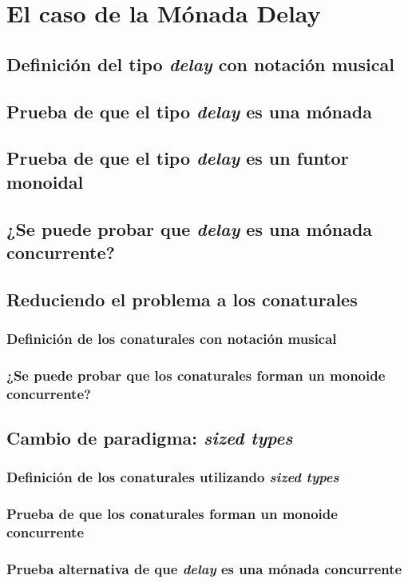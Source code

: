 \chapter{El caso de la Mónada Delay}\label{chapter:casodelay}

\section{Definición del tipo \textit{delay} con notación musical}\label{casodelay:defmus}

\section{Prueba de que el tipo \textit{delay} es una mónada}

\section{Prueba de que el tipo \textit{delay} es un funtor monoidal}

\section{¿Se puede probar que \textit{delay} es una mónada concurrente?}

\section{Reduciendo el problema a los conaturales}

\subsection{Definición de los conaturales con notación musical}

\subsection{¿Se puede probar que los conaturales forman un monoide concurrente?}

\section{Cambio de paradigma: \textit{sized types}}

\subsection{Definición de los conaturales utilizando \textit{sized types}}

\subsection{Prueba de que los conaturales forman un monoide concurrente}

\subsection{Prueba alternativa de que \textit{delay} es una mónada concurrente}